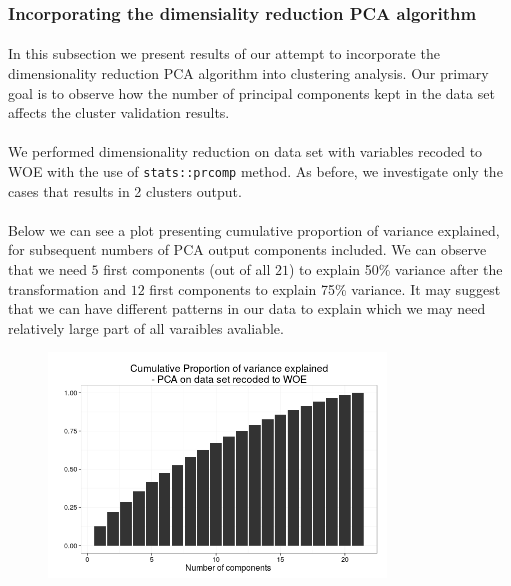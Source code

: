 \documentclass[10pt]{article}\usepackage[]{graphicx}\usepackage[]{color}
\begin{document}
\subsubsection{Incorporating the dimensiality reduction PCA algorithm}
\paragraph{}
In this subsection we present results of our attempt to incorporate the dimensionality reduction 
PCA algorithm into clustering analysis. Our primary goal is to observe how the number of principal components 
kept in the data set affects the cluster validation results. 
\paragraph{}
We performed dimensionality reduction on data set with variables recoded to WOE with the use of 
\texttt{stats::prcomp} method.  As before, we investigate only the cases 
that results in 2 clusters output. 

\paragraph{}
Below we can see a plot presenting cumulative proportion
of variance explained, for subsequent numbers of PCA output components included.
We can observe that we need $5$ first components (out of all $21$) to explain 50\% variance after
the transformation and  $12$ first components to explain 75\% variance. It may suggest 
that we can have different patterns in our data to explain which we may need 
relatively large part of all varaibles avaliable. 

\begin{figure}[h!]
\centering
\includegraphics[width=0.8\textwidth]{Plots2/pca-result.png}
\end{figure}
\end{document}
